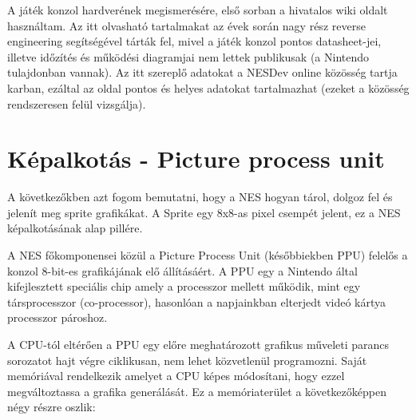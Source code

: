 A játék konzol hardverének megismerésére, első sorban a hivatalos wiki oldalt használtam. Az itt olvasható tartalmakat az évek során nagy rész reverse engineering segítségével tárták fel, mivel a játék konzol pontos datasheet-jei, illetve időzítés és működési diagramjai nem lettek publikusak (a Nintendo tulajdonban vannak). Az itt szereplő adatokat a NESDev online közösség tartja karban, ezáltal az oldal pontos és helyes adatokat tartalmazhat (ezeket a közösség rendszeresen felül vizsgálja).   

\section{Képalkotás - Picture process unit}

A következőkben azt fogom bemutatni, hogy a NES hogyan tárol, dolgoz fel és jelenít meg sprite grafikákat. A Sprite egy 8x8-as pixel csempét jelent, ez a NES képalkotásának alap pillére.

A NES főkomponensei közül a Picture Process Unit (későbbiekben PPU) felelős a konzol 8-bit-es grafikájának elő állításáért. A PPU egy a Nintendo által kifejlesztett speciális chip amely a processzor mellett működik, mint egy társprocesszor (co-processor), hasonlóan a napjainkban elterjedt videó kártya processzor pároshoz.

A CPU-tól eltérően a PPU egy előre meghatározott grafikus műveleti parancs sorozatot hajt végre ciklikusan, nem lehet közvetlenül programozni. Saját memóriával rendelkezik
amelyet a CPU képes módosítani, hogy ezzel megváltoztassa a grafika generálását. Ez a memóriaterület a következőképpen négy részre oszlik:

